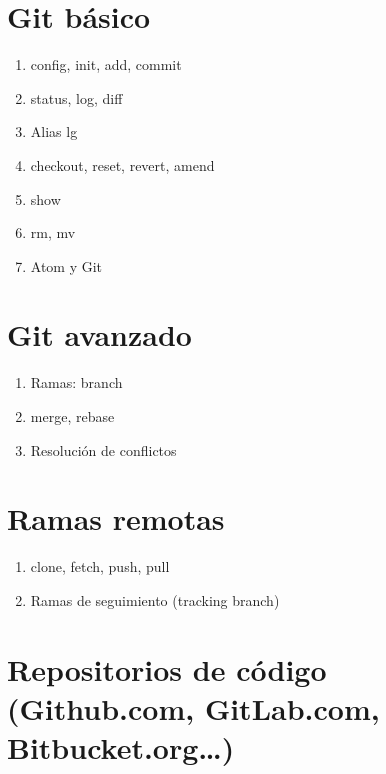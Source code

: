 \documentclass[a4paper,11pt,spanish]{sphinxmanual}
\begin{document}
\section{Git básico}
\label{\detokenize{introduccion:git-basico}}\begin{enumerate}
\item {} 
config, init, add, commit

\item {} 
status, log, diff

\item {} 
Alias lg

\item {} 
checkout, reset, revert, \textendash{}amend

\item {} 
show

\item {} 
rm, mv

\item {} 
Atom y Git

\end{enumerate}


\section{Git avanzado}
\label{\detokenize{introduccion:git-avanzado}}\begin{enumerate}
\item {} 
Ramas: branch

\item {} 
merge, rebase

\item {} 
Resolución de conflictos

\end{enumerate}


\section{Ramas remotas}
\label{\detokenize{introduccion:ramas-remotas}}\begin{enumerate}
\item {} 
clone, fetch, push, pull

\item {} 
Ramas de seguimiento (tracking branch)

\end{enumerate}


\section{Repositorios de código (Github.com, GitLab.com, Bitbucket.org…)}
\label{\detokenize{introduccion:repositorios-de-codigo-github-com-gitlab-com-bitbucket-org}}
\end{document}
